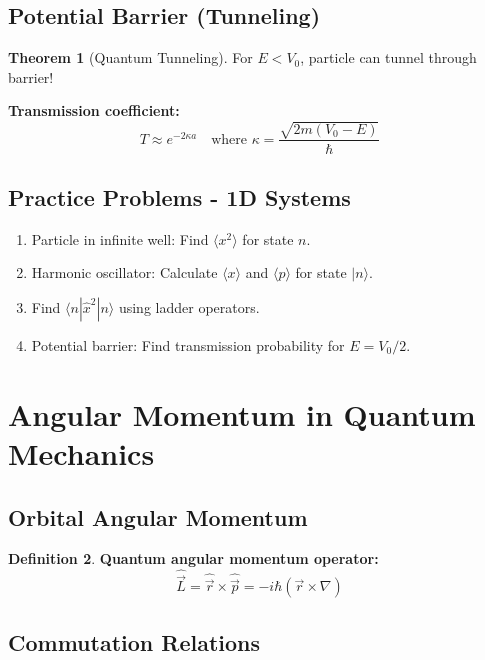 \documentclass[12pt,a4paper]{article}
\theoremstyle{definition}
\newtheorem{theorem}{Theorem}[section]
\newtheorem{definition}[theorem]{Definition}
\begin{document}
\subsection{Potential Barrier (Tunneling)}

\begin{theorem}[Quantum Tunneling]
For $E < V_0$, particle can tunnel through barrier!

\textbf{Transmission coefficient:}
\[
T \approx e^{-2\kappa a} \quad \text{where } \kappa = \frac{\sqrt{2m(V_0 - E)}}{\hbar}
\]
\end{theorem}

\subsection{Practice Problems - 1D Systems}

\begin{enumerate}
    \item Particle in infinite well: Find $\langle x^2\rangle$ for state $n$.
    \item Harmonic oscillator: Calculate $\langle x\rangle$ and $\langle p\rangle$ for state $|n\rangle$.
    \item Find $\langle n|\hat{x}^2|n\rangle$ using ladder operators.
    \item Potential barrier: Find transmission probability for $E = V_0/2$.
\end{enumerate}

\newpage
\section{Angular Momentum in Quantum Mechanics}

\subsection{Orbital Angular Momentum}

\begin{definition}
\textbf{Quantum angular momentum operator:}
\[
\hat{\vec{L}} = \hat{\vec{r}} \times \hat{\vec{p}} = -i\hbar(\vec{r} \times \nabla)
\]
\end{definition}

\subsection{Commutation Relations}
\end{document}
